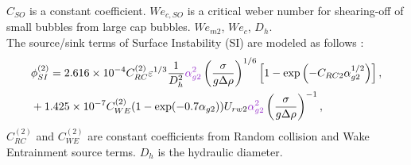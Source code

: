 $C_{SO}$ is a constant coefficient. $We_{c,SO}$ is a critical weber number for shearing-off of small bubbles from large cap bubbles. $We_{m2}$, $We_c$, $D_h$.\\
The source/sink terms of Surface Instability (SI) are modeled as follows :
 \begin{align}
 \begin{split}
 & \phi_{SI}^{(2)} = 2.616 \times 10^{-4} C_{RC}^{(2)} \varepsilon^{1/3} \frac{1}{D_h^2} {\color{mydarkorchid}\alpha_{g2}^2} \left( \frac{\sigma}{g \Delta \rho} \right)^{1/6} \left[ 1 - \exp\left( - C_{RC2} \alpha_{g2}^{1/2} \right)  \right], \\
 & + 1.425 \times 10^{-7} C_{WE}^{(2)}( 1 - \exp(-0.7 \alpha_{g2}) ) U_{rw2} {\color{mydarkorchid}\alpha_{g2}^2} \left( \frac{\sigma}{g \Delta \rho} \right)^{-1},
 \end{split}
 \end{align}
$C_{RC}^{(2)}$ and $C_{WE}^{(2)}$ are constant coefficients from Random collision and Wake Entrainment source terms. $D_h$ is the hydraulic diameter.

